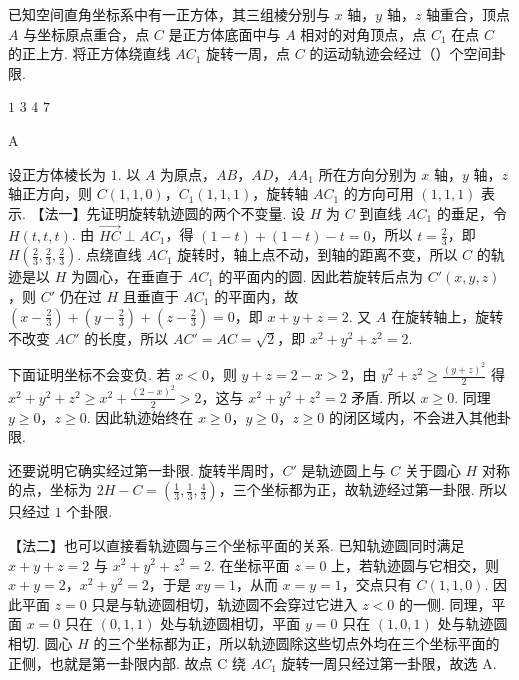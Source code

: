 \begin{problem}
已知空间直角坐标系中有一正方体，其三组棱分别与 \( x \) 轴，\( y \) 轴，\( z \) 轴重合，顶点 \(A\) 与坐标原点重合，点 \(C\) 是正方体底面中与 \(A\) 相对的对角顶点，点 \(C_1\) 在点 \(C\) 的正上方. 将正方体绕直线 \(AC_1\) 旋转一周，点 \(C\) 的运动轨迹会经过（\quad）个空间卦限.


\choices
    {\(1\)}
    {\(3\)}
    {\(4\)}
    {\(7\)}
\end{problem}

\begin{answer}
A
\end{answer}

\begin{solution}
设正方体棱长为 \( 1 \). 以 \(A\) 为原点，\(AB\)，\(AD\)，\(AA_1\) 所在方向分别为 \( x \) 轴，\( y \) 轴，\( z \) 轴正方向，则 \( C\left( 1,1,0 \right) \)，\( C_1\left( 1,1,1 \right) \)，旋转轴 \(AC_1\) 的方向可用 \( \left( 1,1,1 \right) \) 表示.
【法一】先证明旋转轨迹圆的两个不变量. 设 \(H\) 为 \(C\) 到直线 \(AC_1\) 的垂足，令 \( H\left( t,t,t \right) \). 由 \( \overrightarrow{HC}\perp AC_1 \)，得 \( \left( 1-t \right)+\left( 1-t \right)-t=0 \)，所以 \( t=\frac{2}{3} \)，即 \( H\left( \frac{2}{3},\frac{2}{3},\frac{2}{3} \right) \). 点绕直线 \(AC_1\) 旋转时，轴上点不动，到轴的距离不变，所以 \(C\) 的轨迹是以 \(H\) 为圆心，在垂直于 \(AC_1\) 的平面内的圆. 因此若旋转后点为 \( C'\left( x,y,z \right) \)，则 \(C'\) 仍在过 \(H\) 且垂直于 \(AC_1\) 的平面内，故 \( \left( x-\frac{2}{3} \right)+\left( y-\frac{2}{3} \right)+\left( z-\frac{2}{3} \right)=0 \)，即 \( x+y+z=2 \). 又 \(A\) 在旋转轴上，旋转不改变 \(AC'\) 的长度，所以 \( AC'=AC=\sqrt{2} \)，即 \( x^2+y^2+z^2=2 \).

下面证明坐标不会变负. 若 \( x<0 \)，则 \( y+z=2-x>2 \)，由 \( y^2+z^2\ge \frac{\left( y+z \right)^2}{2} \) 得 \( x^2+y^2+z^2\ge x^2+\frac{\left( 2-x \right)^2}{2}>2 \)，这与 \( x^2+y^2+z^2=2 \) 矛盾. 所以 \( x\ge0 \). 同理 \( y\ge0 \)，\( z\ge0 \). 因此轨迹始终在 \( x\ge0 \)，\( y\ge0 \)，\( z\ge0 \) 的闭区域内，不会进入其他卦限.

还要说明它确实经过第一卦限. 旋转半周时，\(C'\) 是轨迹圆上与 \(C\) 关于圆心 \(H\) 对称的点，坐标为 \( 2H-C=\left( \frac{1}{3},\frac{1}{3},\frac{4}{3} \right) \)，三个坐标都为正，故轨迹经过第一卦限. 所以只经过 \( 1 \) 个卦限.

【法二】也可以直接看轨迹圆与三个坐标平面的关系. 已知轨迹圆同时满足 \( x+y+z=2 \) 与 \( x^2+y^2+z^2=2 \). 在坐标平面 \( z=0 \) 上，若轨迹圆与它相交，则 \( x+y=2 \)，\( x^2+y^2=2 \)，于是 \( xy=1 \)，从而 \( x=y=1 \)，交点只有 \( C\left( 1,1,0 \right) \). 因此平面 \( z=0 \) 只是与轨迹圆相切，轨迹圆不会穿过它进入 \( z<0 \) 的一侧. 同理，平面 \( x=0 \) 只在 \( \left( 0,1,1 \right) \) 处与轨迹圆相切，平面 \( y=0 \) 只在 \( \left( 1,0,1 \right) \) 处与轨迹圆相切. 圆心 \(H\) 的三个坐标都为正，所以轨迹圆除这些切点外均在三个坐标平面的正侧，也就是第一卦限内部. 故点 C 绕 \(AC_1\) 旋转一周只经过第一卦限，故选 A.
\end{solution}
